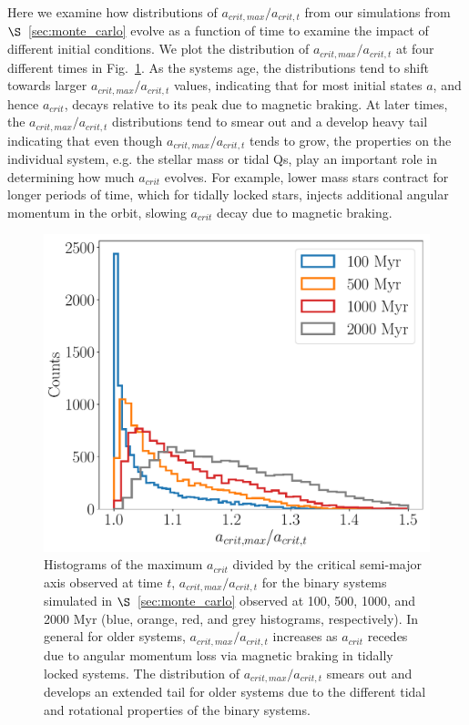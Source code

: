 Here we examine how distributions of $a_{crit,max}/a_{crit,t}$ from our simulations from $\S$~\ref{sec:monte_carlo} evolve as a function of time to examine the impact of different initial conditions.  We plot the distribution of $a_{crit,max}/a_{crit,t}$ at four different times in Fig.~\ref{fig:acrit_hist}.  As the systems age, the distributions tend to shift towards larger $a_{crit,max}/a_{crit,t}$ values, indicating that for most initial states $a$, and hence $a_{crit}$, decays relative to its peak due to magnetic braking.  At later times, the $a_{crit,max}/a_{crit,t}$ distributions tend to smear out and a develop heavy tail indicating that even though $a_{crit,max}/a_{crit,t}$ tends to grow, the properties on the individual system, e.g. the stellar mass or tidal Qs, play an important role in determining how much $a_{crit}$ evolves.  For example, lower mass stars contract for longer periods of time, which for tidally locked stars, injects additional angular momentum in the orbit, slowing $a_{crit}$ decay due to magnetic braking.

\begin{figure}
	\includegraphics[width=\columnwidth]{acrit_hist.pdf}
    \caption{Histograms of the maximum $a_{crit}$ divided by the critical semi-major axis observed at time $t$, $a_{crit,max}/a_{crit,t}$ for the binary systems simulated in $\S$~\ref{sec:monte_carlo} observed at 100, 500, 1000, and 2000 Myr (blue, orange, red, and grey histograms, respectively).  In general for older systems, $a_{crit,max}/a_{crit,t}$ increases as $a_{crit}$ recedes due to angular momentum loss via magnetic braking in tidally locked systems.  The distribution of $a_{crit,max}/a_{crit,t}$ smears out and develops an extended tail for older systems due to the different tidal and rotational properties of the binary systems.}
    \label{fig:acrit_hist}
\end{figure}

